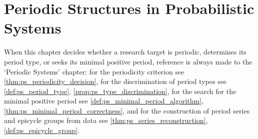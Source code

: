 \chapter{Periodic Structures in Probabilistic Systems}
\label{chap:prob_periodic}
\label{chap:probability-periodic}

\begin{remark}\label{rem:prob_ps_hook}
When this chapter decides whether a research target is periodic, determines its period type, or seeks its minimal positive period, reference is always made to the `Periodic Systems' chapter:
for the periodicity criterion see \cref{thm:ps_periodicity_decision},
for the discrimination of period types see \cref{def:ps_period_type}, \cref{prop:ps_type_discrimination},
for the search for the minimal positive period see \cref{def:ps_minimal_period_algorithm}, \cref{thm:ps_minimal_period_correctness},
and for the construction of period series and epicycle groups from data see \cref{thm:ps_series_reconstruction}, \cref{def:ps_epicycle_group}.
\end{remark}


